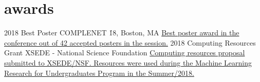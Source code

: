 \documentclass[]{cv-style}          %
\begin{document}
\section{awards}
\begin{entrylist}
\entry
{2018}
{Best Poster}
{COMPLENET \'18, Boston, MA}
{\href{https://complenet18.weebly.com/}{Best poster award in the conference out of 42 accepted posters in the session.}}
\entry
{2018}
{Computing Resources Grant}
{XSEDE - National Science Foundation}
{\href{https://portal.xsede.org/allocations/research}{Computing resources proposal submitted to XSEDE/NSF. Resources were used during the Machine Learning Research for Undergraduates Program in the Summer/2018.}}
\end{entrylist}




\end{document}
